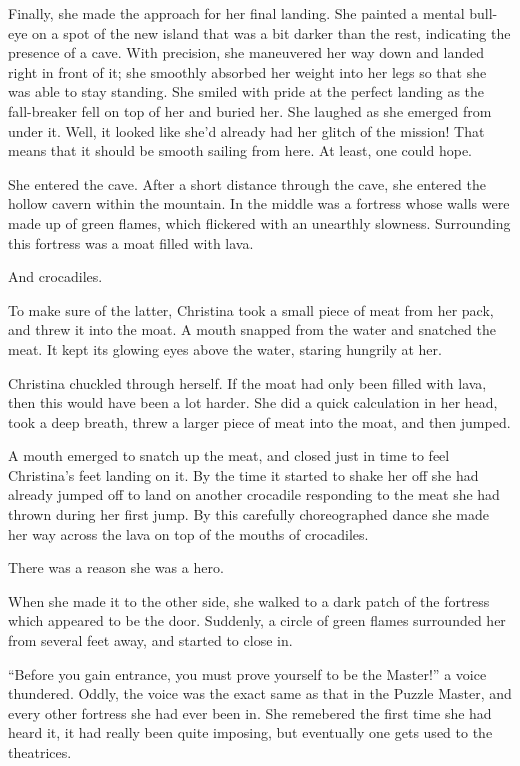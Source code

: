 \documentclass[showtrims,b6paper,draft,10pt]{memoir}
\begin{document}
Finally, she made the approach for her final landing.  She painted a mental bull-eye on a spot of the new island that was a bit darker than the rest, indicating the presence of a cave.  With precision, she maneuvered her way down and landed right in front of it;  she smoothly absorbed her weight into her legs so that she was able to stay standing.  She smiled with pride at the perfect landing as the fall-breaker fell on top of her and buried her.  She laughed as she emerged from under it.  Well, it looked like she'd already had her glitch of the mission!  That means that it should be smooth sailing from here.  At least, one could hope.

She entered the cave.
After a short distance through the cave, she entered the hollow cavern within the mountain.  In the middle was a fortress whose walls were made up of green flames, which flickered with an unearthly slowness.  Surrounding this fortress was a moat filled with lava.

And crocadiles.

To make sure of the latter, Christina took a small piece of meat from her pack, and threw it into the moat.  A mouth snapped from the water and snatched the meat.  It kept its glowing eyes above the water, staring hungrily at her.

Christina chuckled through herself.  If the moat had only been filled with lava, then this would have been a lot harder.  She did a quick calculation in her head, took a deep breath, threw a larger piece of meat into the moat, and then jumped.

A mouth emerged to snatch up the meat, and closed just in time to feel Christina's feet landing on it.  By the time it started to shake her off she had already jumped off to land on another crocadile responding to the meat she had thrown during her first jump.  By this carefully choreographed dance she made her way across the lava on top of the mouths of crocadiles.

There was a reason she was a hero.

When she made it to the other side, she walked to a dark patch of the fortress which appeared to be the door.  Suddenly, a circle of green flames surrounded her from several feet away, and started to close in.

``Before you gain entrance, you must prove yourself to be the Master!'' a voice thundered.  Oddly, the voice was the exact same as that in the Puzzle Master, and every other fortress she had ever been in.  She remebered the first time she had heard it, it had really been quite imposing, but eventually one gets used to the theatrices.
\end{document}
